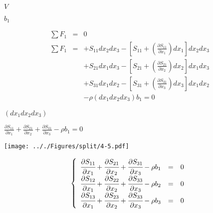 \documentclass[onecolumn,11pt]{report}
\def\lthtmlcheckvsize{\ifdim\ht\sizebox<\vsize 
  \ifdim\wd\sizebox<\hsize\expandafter\hfill\fi \expandafter\vfill
  \else\expandafter\vss\fi}%
\begin{document}
{\newpage\clearpage
{}%
$ V$%
\lthtmlindisplaymathZ
\lthtmlcheckvsize\clearpage}

{\newpage\clearpage
{}%
$ b_1$%
\lthtmlindisplaymathZ
\lthtmlcheckvsize\clearpage}

{\newpage\clearpage
{}%
\begin{displaymath}\begin{array}{rcl}
\sum F_1 & = & 0 \\
\sum F_1 & =
& + S_{11} dx_2 dx_3 - \left[ S_{11} + (\frac{\partial S_{11}}{\partial x_1}) dx_1 \right] dx_2 dx_3 \\
& & + S_{21} dx_1 dx_3 - \left[ S_{21} + (\frac{\partial S_{21}}{\partial x_2}) dx_2 \right] dx_1 dx_3 \\
& & + S_{31} dx_1 dx_2 - \left[ S_{31} + (\frac{\partial S_{31}}{\partial x_3}) dx_3 \right] dx_1 dx_2 \\
& & - \rho (dx_1 dx_2 dx_3) b_1 = 0
\end{array}\end{displaymath}%
\lthtmldisplayZ
\lthtmlcheckvsize\clearpage}

{\newpage\clearpage
{}%
$ (dx_1 dx_2 dx_3)$%
\lthtmlindisplaymathZ
\lthtmlcheckvsize\clearpage}

{\newpage\clearpage
{}%
$\displaystyle \frac{\partial S_{11}}{\partial x_1} +
\frac{\partial S_{21}}{\partial x_2} +
\frac{\partial S_{31}}{\partial x_3} -
\rho b_1 = 0$%
\lthtmlindisplaymathZ
\lthtmlcheckvsize\clearpage}

{\newpage\clearpage
{}%
\texttt{[image: .././Figures/split/4-5.pdf]}%
\lthtmlpictureZ
\lthtmlcheckvsize\clearpage}

{\newpage\clearpage
{}%
\begin{displaymath}\displaystyle
\left\lbrace
\begin{array}{rcl}
\cfrac{\partial S_{11}}{\partial x_1} +
\cfrac{\partial S_{21}}{\partial x_2} +
\cfrac{\partial S_{31}}{\partial x_3} -
\rho b_1 & = & 0 \\
\cfrac{\partial S_{12}}{\partial x_1} +
\cfrac{\partial S_{22}}{\partial x_2} +
\cfrac{\partial S_{33}}{\partial x_3} -
\rho b_2 & = & 0 \\
\cfrac{\partial S_{13}}{\partial x_1} +
\cfrac{\partial S_{23}}{\partial x_2} +
\cfrac{\partial S_{33}}{\partial x_3} -
\rho b_3 & = & 0 \\
\end{array}
\right.\end{displaymath}%
\lthtmldisplayZ
\lthtmlcheckvsize\clearpage}
\end{document}
